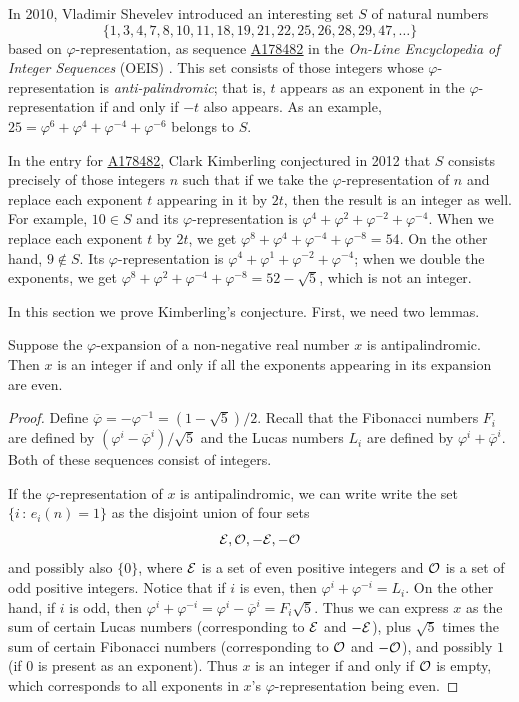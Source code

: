 \documentclass[12pt,reqno]{article}
\newcommand{\seqnum}[1]{\href{https://oeis.org/#1}{\rm \underline{#1}}}
\def\suchthat{\, : \,}
\begin{document}
In 2010, Vladimir Shevelev introduced an interesting set $S$ of natural numbers 
$$\{ 1,3,4,7,8,10,11,18,19,21,22,25,26,28,29,47,\ldots\}$$ based on $\varphi$-representation, as  sequence \seqnum{A178482} in the {\it On-Line Encyclopedia of Integer Sequences}
(OEIS) \cite{oeis}.   This set consists of those integers whose $\varphi$-representation is {\it anti-palindromic}; that is, $t$ appears as an exponent in the
$\varphi$-representation if and only if $-t$ also appears.  As an example, 
$25 = \varphi^6 + \varphi^4 + \varphi^{-4} + \varphi^{-6}$ belongs to $S$.

In the entry for \seqnum{A178482}, Clark Kimberling conjectured in 2012 that $S$ consists precisely of those integers $n$
such that if we take the 
$\varphi$-representation of $n$
and replace each exponent $t$ appearing in it by $2t$, then
the result is an integer as well.  For
example, $10 \in S$ and
its $\varphi$-representation
is $\varphi^4 + \varphi^2 + \varphi^{-2} + \varphi^{-4}$.  When
we replace each exponent $t$ by $2t$,
we get $\varphi^8 + \varphi^4 + \varphi^{-4} + \varphi^{-8} = 54$.
On the other hand, $9 \not\in S$.
Its $\varphi$-representation is
$\varphi^4 + \varphi^1 + \varphi^{-2} + \varphi^{-4}$; when
we double the exponents, we get
$\varphi^8 + \varphi^2 + \varphi^{-4} + \varphi^{-8} = 52 - \sqrt{5}$, which is not an integer.

In this section we prove Kimberling's conjecture.
First, we need two lemmas.
\begin{lemma}
Suppose the $\varphi$-expansion of a non-negative real number $x$ is antipalindromic.  Then $x$ is an integer if and only if all the exponents appearing in its expansion are even.
\label{one}
\end{lemma}

\begin{proof}
Define $\overline{\varphi} = -\varphi^{-1} = (1-\sqrt{5})/2$.   Recall that the Fibonacci numbers $F_i$ are defined
by $(\varphi^i - \overline{\varphi}^i)/\sqrt{5}$ and
the Lucas numbers $L_i$ are defined
by $\varphi^i + \overline{\varphi}^i$.
Both of these sequences consist of integers.  

If the $\varphi$-representation of $x$ is antipalindromic, we can write write the
set $\{ i \suchthat e_i(n) = 1 \}$
as the disjoint union of four sets
$${\cal E}, {\cal O}, 
-{\cal E}, -{\cal O}$$
and possibly also $\{0\}$,
where $\cal E$ is a set of even positive integers and $\cal O$ is a set of odd positive integers.
Notice that if $i$ is even, then
$\varphi^i + \varphi^{-i} = L_i$.
On the other hand, if $i$ is odd,
then $\varphi^i + \varphi^{-i} =
\varphi^i - \overline{\varphi}^i =
F_i \sqrt{5}$.
Thus we can express $x$ as the sum of
certain Lucas numbers (corresponding to ${\cal E}$ and $-{\cal E}$), plus $\sqrt{5}$ times the sum of certain Fibonacci numbers (corresponding to
${\cal O}$ and $-{\cal O}$), and possibly $1$ (if $0$ is present as an exponent).   Thus $x$ is an integer if and only if ${\cal O}$ is empty, which corresponds to all exponents in $x$'s $\varphi$-representation being even.
\end{proof}
\end{document}
